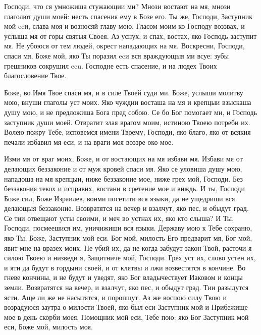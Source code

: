 

\label{_content_pravilo-svyatogo-amvrosiya}



\begin{mymulticols}





Господи, что ся умножиша стужающии ми? Мнози востают на мя, мнози глаголют души моей: несть спасения ему в Бозе его. Ты же, Господи, Заступник мой ecи, слава моя и возносяй главу мою. Гласом моим ко Господу воззвах, и услыша мя от горы святыя Своея. Аз уснух, и спах, востах, яко Господь заступит мя. Не убоюся от тем людей, окрест нападающих на мя. Воскресни, Господи, спаси мя, Боже мой, яко Ты поразил ecи вся враждующыя ми всуе: зубы грешников сокрушил ecu. Господне есть спасение, и на людех Твоих благословение Твое.




Боже, во Имя Твое спаси мя, и в силе Твоей суди ми. Боже, услыши молитву мою, внуши глаголы уст моих. Яко чуждии восташа на мя и крепцыи взыскаша душу мою, и не предложиша Бога пред собою. Се бо Бог помогает ми, и Господь заступник души моей. Отвратит злая врагом моим, истиною Твоею потреби их. Волею пожру Тебе, исповемся имени Твоему, Господи, яко благо, яко от всякия печали избавил мя еси, и на враги моя воззре око мое.




Изми мя от враг моих, Боже, и от востающих на мя избави мя. Избави мя от делающих беззаконие и от муж кровей спаси мя. Яко се уловиша душу мою, нападоша на мя крепцыи, ниже беззаконие мое, ниже грех мой, Господи. Без беззакония текох и исправих, востани в сретение мое и виждь. И ты, Господи Боже сил, Боже Израилев, вонми посетити вся языки, да не ущедриши вся делающыя беззаконие. Возвратятся на вечер и взалчут, яко пес, и обыдут град. Се тии отвещают усты своими, и меч во устнах их, яко кто слыша? И Ты, Господи, посмеешися им, уничижиши вся языки. Державу мою к Тебе сохраню, яко Ты, Боже, Заступник мой еси. Бог мой, милость Его предварит мя, Бог мой, явит мне на вразех моих. Не убий их, да не когда забудут закон Твой, расточи я силою Твоею и низведи я, Защитниче мой, Господи. Грех уст их, слово устен их, и яти да будут в гордыни своей, и от клятвы и лжи возвестятся в кончине. Во гневе кончины, и не будут и уведят, яко Бог владычествует Иаковом и концы земли. Возвратятся на вечер, и взалчут, яко пес, и обыдут град. Тии разыдутся ясти. Аще ли же не насытятся, и поропщут. Аз же воспою силу Твою и возрадуюся заутра о милости Твоей, яко был еси Заступник мой и Прибежище мое в день скорби моея. Помощник мой еси, Тебе пою: яко Бог Заступник мой еси, Боже мой, милость моя.



\end{mymulticols}
